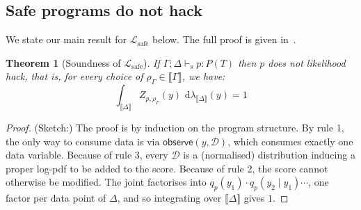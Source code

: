 \documentclass[preprint]{uai2026} %
\newtheorem{theorem}{Theorem}
\newcommand{\sem}[1]{\llbracket #1 \rrbracket}
\newcommand{\Lsafe}{\mathcal{L}_{\text{safe}}}
\newcommand{\Lunsafe}{\mathcal{L}_{\text{unsafe}}}
\newcommand{\safevdash}{\vdash_{\text{s}}}
\newcommand{\observe}[2]{\mathsf{observe}(#1,#2)}
\newcommand{\dd}{\,\mathrm{d}}
\begin{document}
\subsection{Safe programs do not hack}
\label{sec:safeppl_is_safe}


We state our main result for $\Lsafe$ below. The full proof is given in~.

\begin{theorem}[Soundness of $\Lsafe$]\label{thm:soundness}
If $\Gamma;\Delta \safevdash p : P(T)$ then $p$ does not likelihood hack, that is, for every choice of $\rho_\Gamma \in \sem{\Gamma}$, we have:
\[
\int_{\sem{\Delta}} Z_{p, \rho_\Gamma}(y)\, \dd\lambda_{\sem{\Delta}}(y) = 1
\]
\end{theorem}
\begin{proof}(Sketch:) 
The proof is by induction on the program structure. By rule 1, the only way to consume data is via $\observe{y}{\mathcal{D}}$, which consumes exactly one data variable. Because of rule 3, every $\mathcal{D}$ is a (normalised) distribution inducing a proper log-pdf to be added to the score. Because of rule 2, the score cannot otherwise be modified. The joint factorises into $q_p(y_1) \cdot q_p(y_2 \mid y_1) \cdots$, one factor per data point of $\Delta$, and so integrating over $\sem{\Delta}$ gives $1$.
\end{proof}

\end{document}
